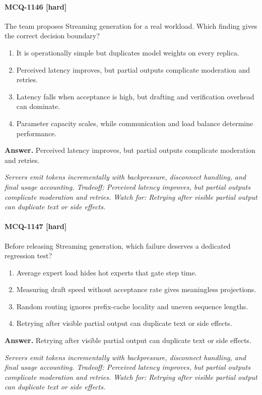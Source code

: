 \paragraph{MCQ-1146 [hard]} The team proposes Streaming generation for a real workload. Which finding gives the correct decision boundary?
\begin{enumerate}[label=\Alph*.]
\item It is operationally simple but duplicates model weights on every replica.
\item Perceived latency improves, but partial outputs complicate moderation and retries.
\item Latency falls when acceptance is high, but drafting and verification overhead can dominate.
\item Parameter capacity scales, while communication and load balance determine performance.
\end{enumerate}
\noindent\textbf{Answer.} Perceived latency improves, but partial outputs complicate moderation and retries.
\par\textit{Servers emit tokens incrementally with backpressure, disconnect handling, and final usage accounting. Tradeoff: Perceived latency improves, but partial outputs complicate moderation and retries. Watch for: Retrying after visible partial output can duplicate text or side effects.}
\paragraph{MCQ-1147 [hard]} Before releasing Streaming generation, which failure deserves a dedicated regression test?
\begin{enumerate}[label=\Alph*.]
\item Average expert load hides hot experts that gate step time.
\item Measuring draft speed without acceptance rate gives meaningless projections.
\item Random routing ignores prefix-cache locality and uneven sequence lengths.
\item Retrying after visible partial output can duplicate text or side effects.
\end{enumerate}
\noindent\textbf{Answer.} Retrying after visible partial output can duplicate text or side effects.
\par\textit{Servers emit tokens incrementally with backpressure, disconnect handling, and final usage accounting. Tradeoff: Perceived latency improves, but partial outputs complicate moderation and retries. Watch for: Retrying after visible partial output can duplicate text or side effects.}
